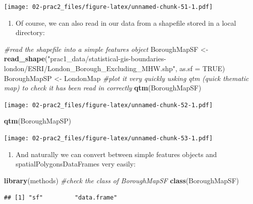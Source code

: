 \documentclass[]{book}
\newenvironment{Shaded}{\begin{snugshade}}{\end{snugshade}}
\newcommand{\CommentTok}[1]{\textcolor[rgb]{0.56,0.35,0.01}{\textit{#1}}}
\newcommand{\DataTypeTok}[1]{\textcolor[rgb]{0.13,0.29,0.53}{#1}}
\newcommand{\KeywordTok}[1]{\textcolor[rgb]{0.13,0.29,0.53}{\textbf{#1}}}
\newcommand{\NormalTok}[1]{#1}
\newcommand{\OtherTok}[1]{\textcolor[rgb]{0.56,0.35,0.01}{#1}}
\newcommand{\StringTok}[1]{\textcolor[rgb]{0.31,0.60,0.02}{#1}}
\providecommand{\tightlist}{%
  \setlength{\itemsep}{0pt}\setlength{\parskip}{0pt}}
\begin{document}
\texttt{[image: 02-prac2\_files/figure-latex/unnamed-chunk-51-1.pdf]}

\begin{enumerate}
\def\labelenumi{\arabic{enumi}.}
\setcounter{enumi}{6}
\tightlist
\item
  Of course, we can also read in our data from a shapefile stored in a local directory:
\end{enumerate}

\begin{Shaded}
\begin{Highlighting}[]
\CommentTok{#read the shapefile into a simple features object}
\NormalTok{BoroughMapSF <-}\StringTok{ }\KeywordTok{read_shape}\NormalTok{(}\StringTok{"prac1_data/statistical-gis-boundaries-london/ESRI/London_Borough_Excluding_MHW.shp"}\NormalTok{, }\DataTypeTok{as.sf =} \OtherTok{TRUE}\NormalTok{)}
\NormalTok{BoroughMapSP <-}\StringTok{ }\NormalTok{LondonMap}
\CommentTok{#plot it very quickly usking qtm (quick thematic map) to check it has been read in correctly}
\KeywordTok{qtm}\NormalTok{(BoroughMapSF)}
\end{Highlighting}
\end{Shaded}

\texttt{[image: 02-prac2\_files/figure-latex/unnamed-chunk-52-1.pdf]}

\begin{Shaded}
\begin{Highlighting}[]
\KeywordTok{qtm}\NormalTok{(BoroughMapSP)}
\end{Highlighting}
\end{Shaded}

\texttt{[image: 02-prac2\_files/figure-latex/unnamed-chunk-53-1.pdf]}

\begin{enumerate}
\def\labelenumi{\arabic{enumi}.}
\setcounter{enumi}{7}
\tightlist
\item
  And naturally we can convert between simple features objects and spatialPolygonsDataFrames very easily:
\end{enumerate}

\begin{Shaded}
\begin{Highlighting}[]
\KeywordTok{library}\NormalTok{(methods)}
\CommentTok{#check the class of BoroughMapSF}
\KeywordTok{class}\NormalTok{(BoroughMapSF)}
\end{Highlighting}
\end{Shaded}

\begin{verbatim}
## [1] "sf"         "data.frame"
\end{verbatim}
\end{document}
